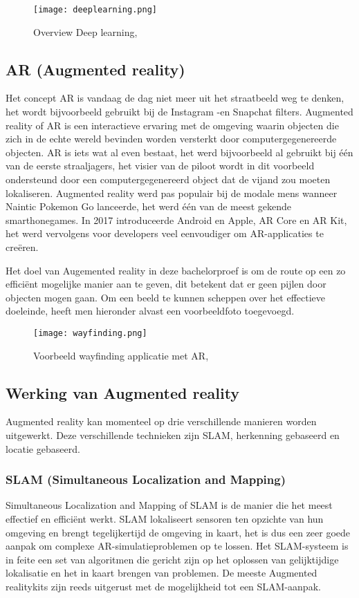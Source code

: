 \begin{figure}[H]
	\centering
	\texttt{[image: deeplearning.png]}
	\caption{Overview Deep learning, \autocite{ObjRec2020}}
\end{figure}

\subsection{AR (Augmented reality)}
Het concept AR is vandaag de dag niet meer uit het straatbeeld weg te denken, het wordt bijvoorbeeld gebruikt bij de Instagram -en Snapchat filters. Augmented reality of AR is een interactieve ervaring met de omgeving waarin objecten die zich in de echte wereld bevinden worden versterkt door computergegenereerde objecten. AR is iets wat al even bestaat, het werd bijvoorbeeld al gebruikt bij één van de eerste straaljagers, het visier van de piloot wordt in dit voorbeeld ondersteund door een computergegenereerd object dat de vijand zou moeten lokaliseren. Augmented reality werd pas populair bij de modale mens wanneer Naintic Pokemon Go lanceerde, het werd één van de meest gekende smarthonegames. In 2017 introduceerde Android en Apple, AR Core en AR Kit, het werd vervolgens voor developers veel eenvoudiger om AR-applicaties te creëren. \autocite{NewGenApps2017}

Het doel van Augemented reality in deze bachelorproef is om de route op een zo efficiënt mogelijke manier aan te geven, dit betekent dat er geen pijlen door objecten mogen gaan. Om een beeld te kunnen scheppen over het effectieve doeleinde, heeft men hieronder alvast een voorbeeldfoto toegevoegd.

\begin{figure}[H]
	\centering
	\texttt{[image: wayfinding.png]}
	\caption{Voorbeeld wayfinding applicatie met AR, \autocite{MAXST2019}}
\end{figure}

\subsection{Werking van Augmented reality}
Augmented reality kan momenteel op drie verschillende manieren worden uitgewerkt. Deze verschillende technieken zijn SLAM, herkenning gebaseerd en locatie gebaseerd.

\subsubsection{SLAM (Simultaneous Localization and Mapping)}
Simultaneous Localization and Mapping of SLAM is de manier die het meest effectief en efficiënt werkt. SLAM lokaliseert sensoren ten opzichte van hun omgeving en brengt tegelijkertijd de omgeving in kaart, het is dus een zeer goede aanpak om complexe AR-simulatieproblemen op te lossen. Het SLAM-systeem is in feite een set van algoritmen die gericht zijn op het oplossen van gelijktijdige lokalisatie en het in kaart brengen van problemen. De meeste Augmented realitykits zijn reeds uitgerust met de mogelijkheid tot een SLAM-aanpak. \autocite{NewGenApps2017}


